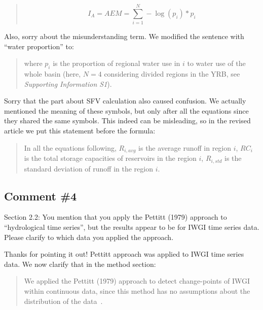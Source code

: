 \begin{quote}
    \begin{equation}
		I_A = AEM = \sum_{i=1}^N - \log(p_{i}) * p_{i}
	\end{equation}
\end{quote}

\AR*{} Also, sorry about the misunderstanding term. We modified the sentence with ``water proportion'' to:

\begin{quote}
    where $p_{i}$ is the proportion of regional water use in $i$ to water use of the whole basin (here, $N=4$ considering divided regions in the YRB, see \textit{Supporting Information S1}).
\end{quote}

\AR*{} Sorry that the part about SFV calculation also caused confusion. We actually mentioned the meaning of these symbols, but only after all the equations since they shared the same symbols. This indeed can be misleading, so in the revised article we put this statement before the formula:

\begin{quote}
    In all the equations following, $R_{i, avg}$ is the average runoff in region $i$, $RC_i$ is the total storage capacities of reservoirs in the region $i$, $R_{i, std}$ is the standard deviation of runoff in the region $i$.
\end{quote}

\subsection{Comment \#4}
\RC{} Section 2.2: You mention that you apply the Pettitt (1979) approach to ``hydrological time series'', but the results appear to be for IWGI time series data. Please clarify to which data you applied the approach.

\AR{} Thanks for pointing it out! Pettitt approach was applied to IWGI time series data. We now clarify that in the method section:

\begin{quote}
    We applied the Pettitt (1979) approach to detect change-points of IWGI within continuous data, since this method has no assumptions about the distribution of the data~\cite{pettitt1979}.
\end{quote}


